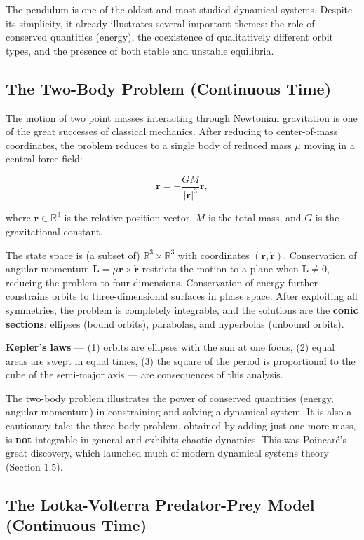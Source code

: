 The pendulum is one of the oldest and most studied dynamical systems. Despite its simplicity, it already illustrates several important themes: the role of conserved quantities (energy), the coexistence of qualitatively different orbit types, and the presence of both stable and unstable equilibria.

\subsection{The Two-Body Problem (Continuous Time)}\label{sec:1.4.3}

The motion of two point masses interacting through Newtonian gravitation is one of the great successes of classical mechanics. After reducing to center-of-mass coordinates, the problem reduces to a single body of reduced mass $\mu$ moving in a central force field:

\[
\ddot{\mathbf{r}} = -\frac{GM}{|\mathbf{r}|^3}\mathbf{r},
\]

where $\mathbf{r} \in \mathbb{R}^3$ is the relative position vector, $M$ is the total mass, and $G$ is the gravitational constant.

The state space is (a subset of) $\mathbb{R}^3 \times \mathbb{R}^3$ with coordinates $(\mathbf{r}, \dot{\mathbf{r}})$. Conservation of angular momentum $\mathbf{L} = \mu\mathbf{r} \times \dot{\mathbf{r}}$ restricts the motion to a plane when $\mathbf{L} \neq 0$, reducing the problem to four dimensions. Conservation of energy further constrains orbits to three-dimensional surfaces in phase space. After exploiting all symmetries, the problem is completely integrable, and the solutions are the \textbf{conic sections}: ellipses (bound orbits), parabolas, and hyperbolas (unbound orbits).

\textbf{Kepler's laws} --- (1) orbits are ellipses with the sun at one focus, (2) equal areas are swept in equal times, (3) the square of the period is proportional to the cube of the semi-major axis --- are consequences of this analysis.

The two-body problem illustrates the power of conserved quantities (energy, angular momentum) in constraining and solving a dynamical system. It is also a cautionary tale: the three-body problem, obtained by adding just one more mass, is \textbf{not} integrable in general and exhibits chaotic dynamics. This was Poincaré's great discovery, which launched much of modern dynamical systems theory (Section 1.5).

\subsection{The Lotka-Volterra Predator-Prey Model (Continuous Time)}\label{sec:1.4.4}

